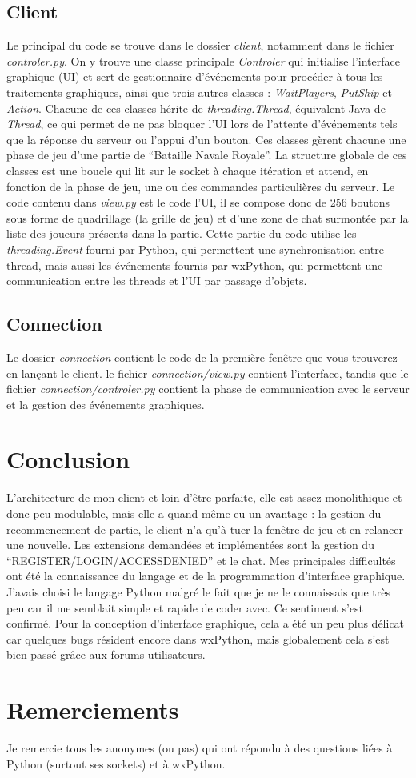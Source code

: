 \documentclass[a4paper, 11pt]{report}
\begin{document}
\subsection{Client}
Le principal du code se trouve dans le dossier \emph{client}, notamment dans le fichier \emph{controler.py}.
On y trouve une classe principale \emph{Controler} qui initialise l'interface graphique (UI) et sert de gestionnaire d'événements pour procéder à tous les traitements graphiques, 
ainsi que trois autres classes : 
\emph{WaitPlayers}, \emph{PutShip} et \emph{Action}. Chacune de ces classes hérite de \emph{threading.Thread}, équivalent Java de 
\emph{Thread}, ce qui permet de ne pas bloquer l'UI lors de l'attente d'événements tels que la réponse du serveur ou l'appui d'un bouton. 
Ces classes gèrent chacune une phase de jeu d'une partie de ``Bataille Navale Royale''.
La structure globale de ces classes est une boucle qui lit sur le socket à chaque itération et attend, en fonction de la phase de jeu, une ou des commandes particulières du serveur. 
\newline
Le code contenu dans \emph{view.py} est le code l'UI, il se compose donc de 256 boutons sous forme de quadrillage (la grille de jeu) et d'une zone de chat surmontée par la liste 
des joueurs présents dans la partie.
\newline
Cette partie du code utilise les \emph{threading.Event} fourni par Python, qui permettent une synchronisation entre thread, mais aussi les 
événements fournis par wxPython, qui permettent une communication entre les threads et l'UI par passage d'objets.

\subsection{Connection}
Le dossier \emph{connection} contient le code de la première fenêtre que vous trouverez en lançant le client. 
le fichier \emph{connection/view.py} contient l'interface, tandis que le fichier \emph{connection/controler.py} contient 
la phase de communication avec le serveur et la gestion des événements graphiques.

\section{Conclusion}
L'architecture de mon client et loin d'être parfaite, elle est assez monolithique et donc peu modulable, mais elle a quand même eu un avantage :
la gestion du recommencement de partie, le client n'a qu'à tuer la fenêtre de jeu et en relancer une nouvelle.
Les extensions demandées et implémentées sont la gestion du ``REGISTER/LOGIN/ACCESSDENIED'' et le chat.
\newline
Mes principales difficultés ont été la connaissance du langage et de la programmation d'interface graphique. 
J'avais choisi le langage Python malgré le fait que je ne le connaissais que très peu car il me semblait simple et rapide de coder avec. 
Ce sentiment s'est confirmé. Pour la conception d'interface graphique, cela a été un peu plus délicat car quelques bugs résident encore dans 
wxPython, mais globalement cela s'est bien passé grâce aux forums utilisateurs.

\section{Remerciements}
Je remercie tous les anonymes (ou pas) qui ont répondu à des questions liées à Python (surtout ses sockets) et à wxPython.
\end{document}
